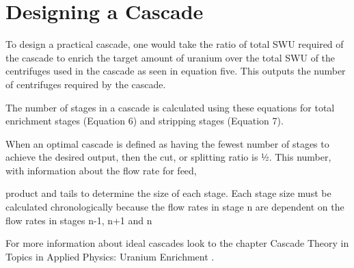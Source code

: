 \section{Designing a Cascade}
To design a practical cascade, one would take the ratio of total SWU required of the cascade to enrich the target amount of uranium over the total SWU of the centrifuges used in the cascade as seen in equation five. This outputs the number of centrifuges required by the cascade.


The number of stages in a cascade is calculated using these equations for total enrichment stages (Equation 6) and stripping stages (Equation 7).



When an optimal cascade is defined as having the fewest number of stages to achieve the desired output, then the cut, or splitting ratio is ½. This number, with information about the flow rate for feed, 

product and tails to determine the size of each stage. Each stage size must be calculated chronologically because the flow rates in stage n are dependent on the flow rates in stages n-1, n+1 and n


For more information about ideal cascades look to the chapter Cascade Theory in Topics in Applied Physics: Uranium Enrichment \cite{Cascade_?}.%
